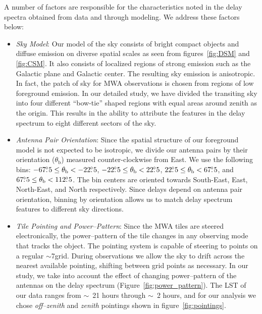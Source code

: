 \documentclass[preprint2,iop,numberedappendix]{emulateapj}
\begin{document}
A number of factors are responsible for the characteristics noted in the delay spectra obtained from data and through modeling. We address these factors below:
\begin{itemize}

\item {\it Sky Model}: Our model of the sky consists of bright compact objects and diffuse emission on diverse spatial scales as seen from figures~\ref{fig:DSM} and \ref{fig:CSM}. It also consists of localized regions of strong emission such as the Galactic plane and Galactic center. The resulting sky emission is anisotropic. In fact, the patch of sky for MWA observations is chosen from regions of low foreground emission. In our detailed study, we have divided the transiting sky into four different ``bow-tie'' shaped regions with equal areas around zenith as the origin. This results in the ability to attribute the features in the delay spectrum to eight different sectors of the sky. %

\item {\it Antenna Pair Orientation}: Since the spatial structure of our foreground model is not expected to be isotropic, we divide our antenna pairs by their orientation ($\theta_\textrm{b}$) measured counter-clockwise from East. We use the following bins: $-67\mbox{$.\!\!^\circ$} 5\le \theta_\textrm{b} < -22\mbox{$.\!\!^\circ$} 5$, $-22\mbox{$.\!\!^\circ$} 5\le \theta_\textrm{b} < 22\mbox{$.\!\!^\circ$} 5$, $22\mbox{$.\!\!^\circ$} 5\le \theta_\textrm{b} < 67\mbox{$.\!\!^\circ$} 5$, and $67\mbox{$.\!\!^\circ$} 5\le \theta_\textrm{b} < 112\mbox{$.\!\!^\circ$} 5$. The bin centers are oriented towards South-East, East, North-East, and North respectively. Since delays depend on antenna pair orientation, binning by orientation allows us to match delay spectrum features to different sky directions.

\item {\it Tile Pointing and Power--Pattern}: Since the MWA tiles are steered electronically, the power--pattern of the tile changes in any observing mode that tracks the object. The pointing system is capable of steering to points on a regular $\sim$7\arcdeg grid. During observations we allow the sky to drift across the nearest available pointing, shifting between grid points as necessary. In our study, we take into account the effect of changing power--pattern of the antennas on the delay spectrum (Figure~\ref{fig:power_pattern}). The LST of our data ranges from $\sim$~21 hours through $\sim$~2 hours, and for our analysis we chose {\it off--zenith} and {\it zenith} pointings shown in figure~\ref{fig:pointings}. 


\end{itemize}
\end{document}
